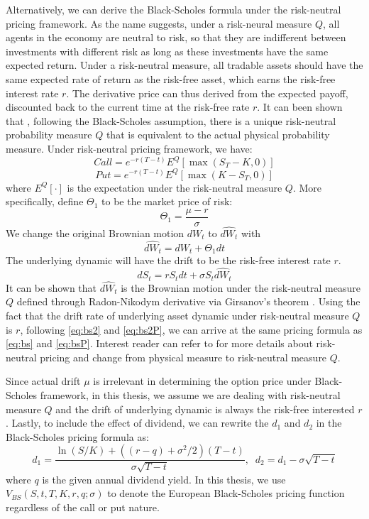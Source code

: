 \documentclass[letterpaper,12pt,titlepage,oneside,final]{book}
\numberwithin{equation}{section}
\theoremstyle{definition}
\begin{document}
Alternatively, we can derive the Black-Scholes formula under the risk-neutral pricing framework. As the name suggests, under a risk-neural measure $Q$, all agents in the economy are neutral to risk, so that they are indifferent between investments with different risk as long as these investments have the same expected return. Under a risk-neutral measure, all tradable assets should have the same expected rate of return as the risk-free asset, which earns the risk-free interest rate $r$. The derivative price can thus derived from the expected payoff, discounted back to the current time at the risk-free rate $r$. It can been shown that \cite{shreve2004stochastic}, following the Black-Scholes assumption, there is a unique risk-neutral probability measure $Q$ that is equivalent to the actual physical probability measure. Under risk-neutral pricing framework, we have:
\begin{equation}
Call=e^{-r(T-t)} E^Q[\max(S_T-K,0)]
\label{eq:bs2}
\end{equation}
\begin{equation}
Put=e^{-r(T-t)} E^Q[\max(K-S_T,0)]
\label{eq:bs2P}
\end{equation}
where $E^Q[\cdot]$ is the expectation under the risk-neutral measure $Q$.
More specifically, define $\Theta_1$ to be the market price of risk:
\begin{equation}
\Theta_1=\frac{\mu-r}{\sigma}
\label{eq:price-risk}
\end{equation}
We change the original Brownian motion $dW_t$ to $\hat{dW_t}$ with
\begin{equation}
\hat{dW_t}=dW_t+\Theta_1 dt
\label{eq:riskS}
\end{equation}
The underlying dynamic will have the drift to be the risk-free interest rate $r$.
\[
dS_t=r S_t dt+\sigma S_t \hat{dW_t}
\]
It can be shown that $\hat{dW_t}$ is the Brownian motion under the risk-neutral measure $Q$ defined through Radon-Nikodym derivative via Girsanov's theorem \cite{shreve2004stochastic}. Using the fact that the drift rate of underlying asset dynamic under risk-neutral measure $Q$ is $r$, following \eqref{eq:bs2} and \eqref{eq:bs2P}, we can arrive at the same pricing formula as \eqref{eq:bs} and \eqref{eq:bsP}. Interest reader can refer to \cite{shreve2004stochastic} for more details about risk-neutral pricing and change from physical measure to risk-neutral measure $Q$.

Since actual drift $\mu$ is irrelevant in determining the option price under Black-Scholes framework, in this thesis, we assume we are dealing with risk-neutral measure $Q$ and the drift of underlying dynamic is always the risk-free interested $r$. 
Lastly, to include the effect of dividend, we can rewrite the $d_1$ and $d_2$ in the Black-Scholes pricing formula as:
\[
d_1=\frac{\ln(S/K)+((r-q)+\sigma^2/2)(T-t)}{\sigma \sqrt{T-t}}, \;\; d_2=d_1-\sigma  \sqrt{T-t}
\]
where $q$ is the given annual dividend yield. In this thesis, we use $V_{BS}(S,t,T,K,r,q;\sigma)$ to denote the European Black-Scholes pricing function regardless of the call or put nature.
\end{document}
